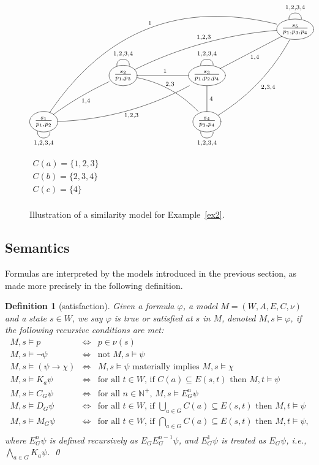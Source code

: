 \documentclass{article}
\newtheorem{definition}[theorem]{Definition}%
\newcommand{\ab}{\ensuremath{A}\xspace}
\renewcommand{\phi}{\varphi}
\newcommand{\ra}{\rightarrow}
\newcommand{\mbN}{\mathbb{N}}
\begin{document}
\begin{figure}
\centering
\parbox{.75\textwidth}{
\centering
$\xymatrix@R=3em@C=6em{
&&
&*++o[F]{\frac{s_5}{p_1,p_3,p_4}}
\ar@{-}@(ul,ur)^{1,2,3,4}
\\
& *++o[F]{\frac{s_2}{p_1,p_3}}
\ar@{-}@(ul,ur)^{1,2,3,4}
\ar@{-}[r]^{1}
\ar@{-}@/^1pc/[dr]^{\hspace{-6pt}2,3}
\ar@{-}@/^1pc/[urr]^{1,2,3}
&*++o[F]{\frac{s_3}{p_1,p_2,p_4}} 
\ar@{-}@(ul,ur)^{1,2,3,4}
\ar@{-}[d]^{4}
\ar@{-}[ru]_{1,4}
\\
*++o[F]{\frac{s_1}{p_1,p_2}}
\ar@{-}@(dl,dr)_{1,2,3,4}
\ar@{-}@/^.3pc/[ur]_{1,4}
\ar@{-}@/_1.2pc/[rru]_{1,2,3}
\ar@{-}@/^5pc/[uurrr]^{1}
&
&*++o[F]{\frac{s_4}{p_3,p_4}}
\ar@{-}@(dl,dr)_{1,2,3,4}
\ar@{-}@/_1pc/[uur]_{2,3,4}
}$
}
\parbox{.23\textwidth}{
$\begin{array}{l}
C(a) = \{1,2,3\}\\
C(b) = \{2,3,4\}\\
C(c) = \{4\}\\
\end{array}$
}
\caption{Illustration of a similarity model for Example~\ref{ex2}.}\label{fig:sim-model}
\end{figure}

\subsection{Semantics}\label{sec:semantics}

Formulas are interpreted by the models introduced in the previous section, as made more precisely in the following definition.

\begin{definition}[satisfaction]\label{def:semantics}
Given a formula $\phi$, a model $M = (W,\ab,E,C,\nu)$ and a state $s \in W$, we say $\phi$ is \emph{true} or \emph{satisfied} at $s$ in $M$, denoted $M,s \models \phi$, if the following recursive conditions are met:
\[
\begin{array}{lll}
M,s \models p & \iff & p\in \nu(s)\\
M,s \models \neg\psi & \iff & \text{not } M,s \models \psi\\
M,s \models (\psi \ra \chi) & \iff & M,s \models \psi \text{ materially implies } M,s \models\chi\\
M,s\models K_a\psi & \iff & \text{for all $t\in W$, if $C(a)\subseteq E(s,t)$ then $M,t \models \psi$}\\
M,s\models C_G\psi & \iff & \text{for all $n \in \mbN^+$, $M,s \models E_G^n \psi$}\\
M,s\models D_G\psi & \iff & \text{for all $t \in W$, if $\bigcup_{a\in G}C(a) \subseteq E(s,t)$ then $M,t \models \psi$}\\
M,s\models M_G\psi & \iff & \text{for all $t \in W$, if $\bigcap_{a\in G}C(a) \subseteq E(s,t)$ then $M,t \models \psi$,}\\
\end{array}
\]
where $E_G^n\psi$ is defined recursively as $E_G E_G^{n-1}\psi$, and $E_G^1\psi$ is treated as $E_G \psi$, i.e., $\bigwedge_{a\in G} K_a\psi$.
\qed
\end{definition}
\end{document}
